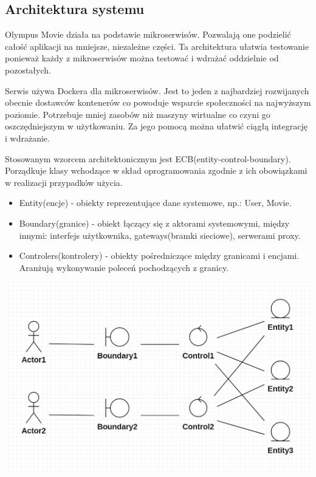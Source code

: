 \documentclass[12pt]{article}
\begin{document}
\begin{flushleft}
		\subsection{Architektura systemu}
		Olympus Movie działa na podstawie mikroserwisów. Pozwalają one podzielić całość aplikacji na mniejsze, niezależne części. Ta architektura ułatwia testowanie ponieważ każdy z mikroserwisów można testować i wdrażać oddzielnie od pozostałych.
		
		Serwis używa Dockera dla mikroserwisów. Jest to jeden z najbardziej rozwijanych obecnie dostawców kontenerów co powoduje wsparcie społeczności na najwyższym poziomie. Potrzebuje mniej zasobów niż maszyny wirtualne co czyni go oszczędniejszym w użytkowaniu. Za jego pomocą można ułatwić ciągłą integrację i wdrażanie.

		Stosowanym wzorcem architektonicznym jest ECB(entity-control-boundary). Porządkuje klasy wchodzące w skład oprogramowania zgodnie z ich obowiązkami w realizacji przypadków użycia.
		\begin{itemize}
			\item Entity(encje) - obiekty reprezentujące dane systemowe, np.: User, Movie.
			\item Boundary(granice) - obiekt łączący się z aktorami systemowymi, między innymi: interfejs użytkownika, gateways(bramki sieciowe), serwerami proxy.
			\item Controlers(kontrolery) - obiekty pośredniczące między granicami i encjami. Aranżują wykonywanie poleceń pochodzących z granicy.
		\end{itemize}

		\includegraphics[scale=0.5]{ECB.png}


\end{flushleft}
\end{document}
